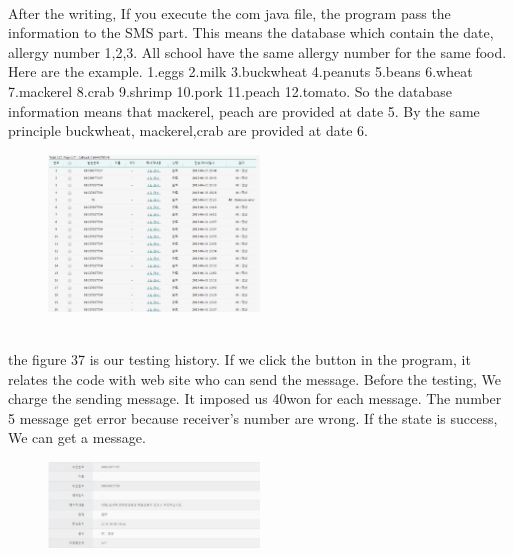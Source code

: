 \documentclass[a4paper,11pt]{IEEEtran}
\begin{document}
{{{\begin{figure}[!h]
        \caption{}
        \label{fig1}
\end{figure}
~\\
After the writing, If you execute the com java file, the program pass the information to the SMS part. This means the database which contain the date, allergy number 1,2,3. All school have the same allergy number for the same food. Here are the example.  1.eggs 2.milk 3.buckwheat 4.peanuts 5.beans 6.wheat 7.mackerel 8.crab 9.shrimp 10.pork 11.peach 12.tomato. So the database information means that mackerel, peach are provided at date 5. By the same principle buckwheat, mackerel,crab are provided at date 6.
~\\
\newpage
\begin{figure}[!h]
        \centering
        \includegraphics[width=0.5\textwidth, height=0.4\textheight]{usec15.jpg}
        \caption{}
        \label{fig1}
\end{figure}
~\\
the figure 37 is our testing history. If we click the button in the program, it relates the code with web site who can send the message. Before the testing, We charge the  sending message. It imposed us 40won for each message. The number 5 message get error because receiver's number are wrong. If the state is success, We can get a message.
~\\
\newpage
\begin{figure}[!h]
        \centering
        \includegraphics[width=0.5\textwidth, height=0.4\textheight]{usec16.jpg}
        \caption{}
        \label{fig1}
\end{figure}
~\\
~\\
\begin{figure}[!h]

\end{figure}}}}
\end{document}
